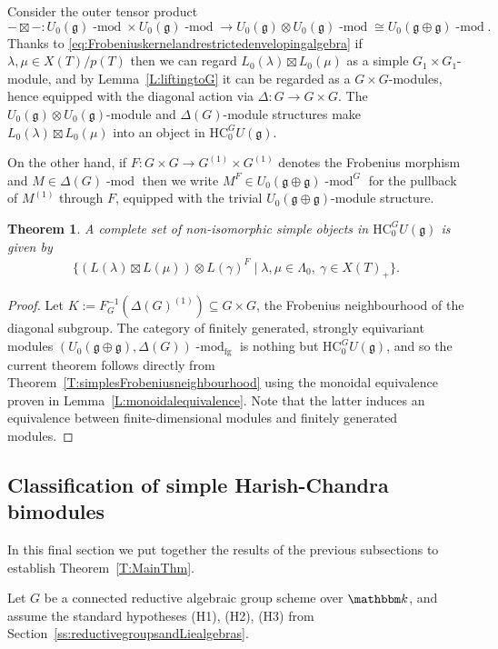 \documentclass[twoside,12pt,reqno]{amsart}
\newtheorem{Theorem}{Theorem}[section]
\theoremstyle{remark}
\numberwithin{equation}{section}
\def\k{{\mathbbm k}}
\def\lmod{\!\operatorname{-mod}}
\def\HC{\mathrm{HC}}
\def\g{{\mathfrak g}}
\newcommand{\fg}{\operatorname{fg}}
\begin{document}
Consider the outer tensor product
$$- \boxtimes - : U_0(\g)\lmod \times U_0(\g) \lmod \to U_0(\g) \otimes U_0(\g) \lmod \cong U_0(\g \oplus \g)\lmod.$$
Thanks to \eqref{eq:Frobeniuskernelandrestrictedenvelopingalgebra} if $\lambda, \mu \in X(T) / p(T)$ then we can regard $L_0(\lambda) \boxtimes L_0(\mu)$ as a simple $G_1 \times G_1$-module, and by Lemma~\ref{L:liftingtoG} it can be regarded as a $G\times G$-modules, hence equipped with the diagonal action via $\Delta : G\to G\times G$. The $U_0(\g) \otimes U_0(\g)$-module and $\Delta(G)$-module structures make $L_0(\lambda) \boxtimes L_0(\mu)$ into an object in $\HC_0^G U(\g)$.

On the other hand, if $F : G \times G \to G^{(1)} \times G^{(1)}$ denotes the Frobenius morphism and $M \in \Delta(G)\lmod$ then we write $M^F \in U_0(\g\oplus \g)\lmod^G$ for the pullback of $M^{(1)}$ through $F$, equipped with the trivial $U_0(\g\oplus \g)$-module structure.

\begin{Theorem}\label{T:classrestsimples}
    A complete set of non-isomorphic simple objects in $\HC_0^G U(\g)$ is given by
    \begin{eqnarray}
        \{(L(\lambda) \boxtimes L(\mu)) \otimes L(\gamma)^F \mid \lambda, \mu \in \Lambda_0, \ \gamma \in X(T)_+\}.
    \end{eqnarray}
\end{Theorem}
\begin{proof}
    Let $K := F_G^{-1}(\Delta(G)^{(1)}) \subseteq G \times G$, the Frobenius neighbourhood of the diagonal subgroup. The category of finitely generated, strongly equivariant modules $(U_0(\g \oplus \g), \Delta(G))\lmod_{\fg}$ is nothing but $\HC_0^G U(\g)$, and so the current theorem follows directly from Theorem~\ref{T:simplesFrobeniusneighbourhood} using the monoidal equivalence proven in Lemma~\ref{L:monoidalequivalence}. Note that the latter induces an equivalence between finite-dimensional modules and finitely generated modules.
\end{proof}


\subsection{Classification of simple Harish-Chandra bimodules}

In this final section we put together the results of the previous subsections to establish Theorem~\ref{T:MainThm}.

Let $G$ be a connected reductive algebraic group scheme over $\k$, and assume the standard hypotheses (H1), (H2), (H3) from Section~\ref{ss:reductivegroupsandLiealgebras}.
\end{document}
